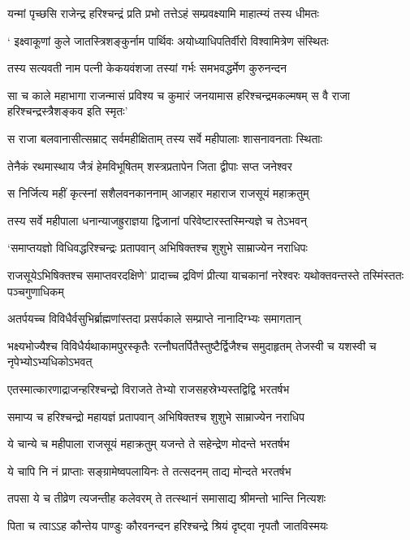 \twolineshloka
{यन्मां पृच्छसि राजेन्द्र हरिश्चन्द्रं प्रति प्रभो}
{तत्तेऽहं सम्प्रवक्ष्यामि माहात्म्यं तस्य धीमतः}


\twolineshloka
{` इक्ष्वाकूणां कुले जातस्त्रिशङ्कुर्नाम पार्थिवः}
{अयोध्याधिपतिर्वीरो विश्वामित्रेण संस्थितः}


\twolineshloka
{तस्य सत्यवती नाम पत्नी केकयवंशजा}
{तस्यां गर्भः समभवद्धर्मेण कुरुनन्दन}


\threelineshloka
{सा च काले महाभागा राजन्मासं प्रविश्य च}
{कुमारं जनयामास हरिश्चन्द्रमकल्मषम्}
{स वै राजा हरिश्चन्द्रस्त्रैशङ्कव इति स्मृतः'}


\twolineshloka
{स राजा बलवानासीत्सम्राट् सर्वमहीक्षिताम्}
{तस्य सर्वे महीपालाः शासनावनताः स्थिताः}


\twolineshloka
{तेनैकं रथमास्थाय जैत्रं हेमविभूषितम्}
{शस्त्रप्रतापेन जिता द्वीपाः सप्त जनेश्वर}


\twolineshloka
{स निर्जित्य महीं कृत्स्नां सशैलवनकाननाम्}
{आजहार महाराज राजसूयं महाक्रतुम्}


\twolineshloka
{तस्य सर्वे महीपाला धनान्याजह्रुराज्ञया}
{द्विजानां परिवेष्टारस्तस्मिन्यज्ञे च तेऽभवन्}


\twolineshloka
{`समाप्तयज्ञो विधिवद्धरिश्चन्द्रः प्रतापवान्}
{अभिषिक्तश्च शुशुभे साम्राज्येन नराधिपः}


राजसूयेऽभिषिक्तश्च समाप्तवरदक्षिणे'
\twolineshloka
{प्रादाच्च द्रविणं प्रीत्या याचकानां नरेश्वरः}
{यथोक्तवन्तस्ते तस्मिंस्ततः पञ्चगुणाधिकम्}


\twolineshloka
{अतर्पयच्च विविधैर्वसुभिर्ब्राह्मणांस्तदा}
{प्रसर्पकाले सम्प्राप्ते नानादिग्भ्यः समागतान्}


\fourlineindentedshloka
{भक्ष्यभोज्यैश्च विविधैर्यथाकामपुरस्कृतैः}
{रत्नौघतर्पितैस्तुष्टैर्द्विजैश्च समुदाहृतम्}
{तेजस्वी च यशस्वी च नृपेभ्योऽभ्यधिकोऽभवत्}
{}


\twolineshloka
{एतस्मात्कारणाद्राजन्हरिश्चन्द्रो विराजते}
{तेभ्यो राजसहस्रेभ्यस्तद्विद्वि भरतर्षभ}


\twolineshloka
{समाप्य च हरिश्चन्द्रो महायज्ञं प्रतापवान्}
{अभिषिक्तश्च शुशुभे साम्राज्येन नराधिप}


\threelineshloka
{ये चान्ये च महीपाला राजसूयं महाक्रतुम्}
{यजन्ते ते सहेन्द्रेण मोदन्ते भरतर्षभ}
{}


\twolineshloka
{ये चापि नि नं प्राप्ताः सङ्ग्रामेष्वपलायिनः}
{ते तत्सदनम् ताद्य मोन्दते भरतर्षभ}


\twolineshloka
{तपसा ये च तीव्रेण त्यजन्तीह कलेवरम्}
{ते तत्स्थानं समासाद्य श्रीमन्तो भान्ति नित्यशः}


\twolineshloka
{पिता च त्वाऽऽह कौन्तेय पाण्डुः कौरवनन्दन}
{हरिश्चन्द्रे श्रियं दृष्ट्वा नृपतौ जातविस्मयः}


